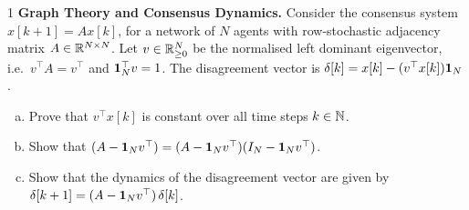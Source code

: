 \documentclass[a4paper, 11pt]{article}
\begin{document}

\begin{problem}{1}
\textbf{Graph Theory and Consensus Dynamics.}
Consider the consensus system $x[k+1]=Ax[k]$, for a network of $N$ agents with row-stochastic adjacency matrix $A\in\mathbb{R}^{N\times N}$. Let $v\in\mathbb{R}^N_{\ge 0}$ be the normalised left dominant eigenvector, i.e.\ $v^\top A=v^\top$ and $\mathbf{1}_N^\top v=1$. The disagreement vector is $\delta[k]=x[k]-(v^\top x[k])\mathbf{1}_N$.
\begin{enumerate}[(a)]
    \item Prove that $v^\top x[k]$ is constant over all time steps $k\in\mathbb{N}$.
    \item Show that $(A-\mathbf{1}_N v^\top)=(A-\mathbf{1}_N v^\top)(I_N-\mathbf{1}_N v^\top)$.
    \item Show that the dynamics of the disagreement vector are given by $\delta[k+1]=(A-\mathbf{1}_N v^\top)\,\delta[k]$.
\end{enumerate}
\end{problem}
\end{document}
